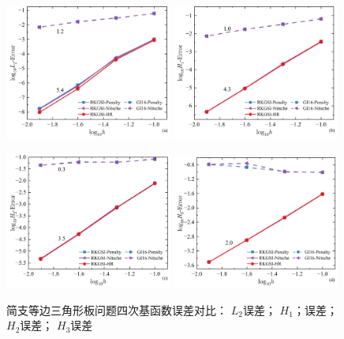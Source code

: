 \newpage
\begin{figure}[H]
    \centering
    \begin{subcaptiongroup}
    \includegraphics[width=0.49\textwidth]{figure/PHR/T/QL2.png}
    \label{QL2}
    \includegraphics[width=0.49\textwidth]{figure/PHR/T/QH1.png}
    \label{QH1}
    \end{subcaptiongroup}
    \begin{subcaptiongroup}
    \includegraphics[width=0.49\textwidth]{figure/PHR/T/QH2.png}
    \label{QH2}
    \includegraphics[width=0.49\textwidth]{figure/PHR/T/QH3.png}
    \label{QH3}
    \end{subcaptiongroup}
\caption{简支等边三角形板问题四次基函数误差对比： $L_2$误差； $H_1$；误差；$H_2$误差； $H_3$误差}
\label{TQLH}
\end{figure}
